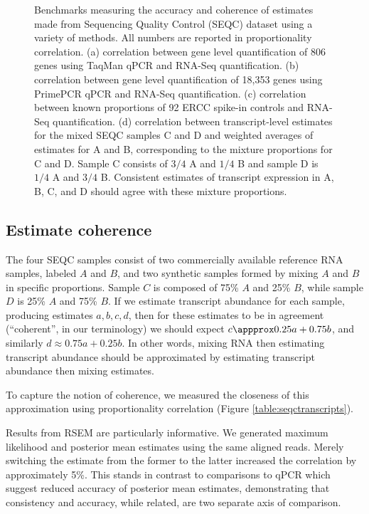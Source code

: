 \documentclass[twocolumn]{article}
\begin{document}
\begin{figure*}
\caption{
Benchmarks measuring the accuracy and coherence of estimates made from
Sequencing Quality Control (SEQC) dataset using a variety of methods.
All numbers are reported in proportionality correlation.
(a) correlation between gene level quantification
of 806 genes using TaqMan qPCR and RNA-Seq quantification.
(b) correlation between gene level quantification
of 18,353 genes using PrimePCR qPCR and RNA-Seq quantification.
(c) correlation between known proportions of 92
ERCC spike-in controls and RNA-Seq quantification.
(d) correlation between transcript-level estimates
for the mixed SEQC samples C and D and weighted averages of estimates for A
and B, corresponding to the mixture proportions for C and D. Sample C consists of
$3/4$ A and $1/4$ B and sample D is $1/4$ A and $3/4$ B. Consistent estimates of
transcript expression in A, B, C, and D should agree with these mixture
proportions.}
\end{figure*}

\subsection{Estimate coherence}\label{estimation-coherence}

The four SEQC samples consist of two commercially available reference RNA
samples, labeled $A$ and $B$, and two synthetic samples formed by mixing $A$ and
$B$ in specific proportions. Sample $C$ is composed of 75\% $A$ and 25\% $B$,
while sample $D$ is 25\% $A$ and 75\% $B$. If we estimate transcript abundance
for each sample, producing estimates $a, b, c, d$, then for these estimates to
be in agreement (``coherent'', in our terminology) we should expect $c \appprox
0.25a + 0.75b$, and similarly $d \approx 0.75a + 0.25b$. In other words, mixing
RNA then estimating transcript abundance should be approximated by estimating
transcript abundance then mixing estimates.

To capture the notion of coherence, we measured the closeness of this
approximation using proportionality correlation (Figure
\ref{table:seqctranscripts}).

Results from RSEM are particularly informative. We generated maximum likelihood
and posterior mean estimates using the same aligned reads. Merely switching the
estimate from the former to the latter increased the correlation by
approximately 5\%. This stands in contrast to comparisons to qPCR which suggest
reduced accuracy of posterior mean estimates, demonstrating that consistency and
accuracy, while related, are two separate axis of comparison.
\end{document}
